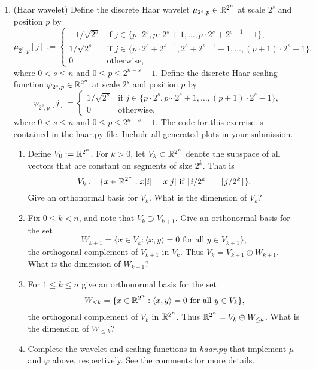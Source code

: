 \documentclass[12pt,twoside]{article}
\begin{document}
\begin{enumerate}
 \item (Haar wavelet) Define the discrete Haar wavelet $\mu_{2^s,p}\in\mathbb{R}^{2^n}$ at scale
  $2^s$ and position $p$ by
  $$\mu_{2^s,p}[j] :=
  \begin{cases}
    -1/\sqrt{2^{s}} & \text{if $j\in\{p\cdot 2^s,p\cdot 2^s+1,\ldots,p\cdot 2^s+2^{s-1}-1\}$,}\\
    1/\sqrt{2^{s}} & \text{if $j\in\{p\cdot 2^s+2^{s-1},2^s+2^{s-1}+1,\ldots,(p+1)\cdot2^{s}-1\}$,}\\
    0 & \text{otherwise,}
  \end{cases}
  $$
  where $0<s\leq n$ and $0 \leq p \leq 2^{n-s}-1$.  Define the
  discrete Haar scaling function $\varphi_{2^s,p}\in\mathbb{R}^{2^n}$ at scale $2^s$ and position $p$  by
  $$\varphi_{2^s,p}[j]=
  \begin{cases}
    1/\sqrt{2^{s}} & \text{if $j\in\{p\cdot 2^s,p\cdots 2^s+1,\ldots,(p+1)\cdot 2^{s}-1\}$,}\\
    0 & \text{otherwise,}
  \end{cases}$$
  where $0<s\leq n$ and $0\leq p\leq 2^{n-s}-1$.
  The code for this
  exercise is contained in the haar.py file. Include all generated plots in your submission.
  \begin{enumerate}
  \item Define $V_0:=\mathbb{R}^{2^n}$.  For $k>0$, let $V_k\subset\mathbb{R}^{2^n}$ denote the subspace
    of all vectors that are constant on segments of size $2^k$.  That
    is
    $$V_k := \{x\in\mathbb{R}^{2^n}: \text{$x[i] = x[j]$ if $\lfloor
      i/2^k\rfloor = \lfloor j/2^k\rfloor$}\}.$$
    Give an orthonormal basis for $V_k$.  What is the dimension of
    $V_k$? 
  \item Fix $0\leq k < n$, and note that $V_k\supset V_{k+1}$.  Give an orthonormal basis for
    the set
    $$W_{k+1}=\{x\in V_k : \text{$\langle x,y\rangle = 0$ for all
      $y\in V_{k+1}$}\},$$
    the orthogonal complement of $V_{k+1}$ in $V_k$.  Thus
    $V_k=V_{k+1}\oplus W_{k+1}$. What is the
    dimension of $W_{k+1}$?
  \item For $1\leq k\leq n$ give an orthonormal basis for the set
    $$W_{\leq k}=\{x\in \mathbb{R}^{2^n} : \text{$\langle x,y\rangle = 0$ for all
      $y\in V_{k}$}\},$$
    the orthogonal complement of $V_{k}$ in $\mathbb{R}^{2^n}$.  Thus
    $\mathbb{R}^{2^n}=V_{k}\oplus W_{\leq k}$. What is the
    dimension of $W_{\leq k}$?
  \item Complete the wavelet and scaling functions in \emph{haar.py} that implement $\mu$
    and $\varphi$ above, respectively.  See the comments for more
    details.

\end{enumerate}
\end{enumerate}
\end{document}
